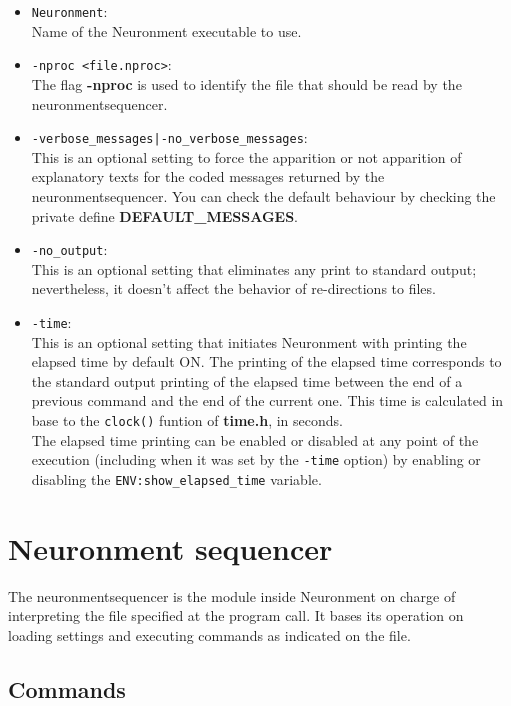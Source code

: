 \begin{itemize}
  \item \texttt{Neuronment}:\\
  Name of the Neuronment executable to use.
  \item \texttt{-nproc <file.nproc>}:\\
  The flag \textbf{-nproc} is used to identify the  file that should be read by the \gls{neuronmentsequencer}.
  \item \texttt{-verbose\_messages|-no\_verbose\_messages}:\\
  This is an optional setting to force the apparition or not apparition of explanatory texts for the coded messages returned by the \gls{neuronmentsequencer}. You can check the default behaviour by checking the private define \textbf{DEFAULT\_MESSAGES}. \lotharcl
  \item \texttt{-no\_output}:\\
  This is an optional setting that eliminates any print to standard output; nevertheless, it doesn't affect the behavior of re-directions to files.
  \item \texttt{-time}:\\
  This is an optional setting that initiates Neuronment with printing the elapsed time by default ON. The printing of the elapsed time corresponds to the standard output printing of the elapsed time between the end of a previous command and the end of the current one. This time is calculated in base to the \texttt{clock()} funtion of \textbf{time.h}, in seconds.\\
  The elapsed time printing can be enabled or disabled at any point of the execution (including when it was set by the \texttt{-time} option) by enabling or disabling the \texttt{ENV:show\_elapsed\_time} variable. \lotharcl
\end{itemize}

\section{Neuronment sequencer}

The \gls{neuronmentsequencer} is the module inside Neuronment on charge of interpreting the  file specified at the program call. It bases its operation on loading settings and executing commands as indicated on the  file.

\subsection{Commands}


